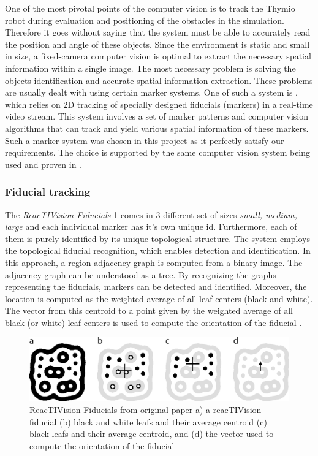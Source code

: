 One of the most pivotal points of the computer vision is to track the Thymio robot during evaluation and positioning of the obstacles in the simulation. Therefore it goes without saying that the system must be able to accurately read the position and angle of these objects. Since the environment is static and small in size, a fixed-camera computer vision is optimal to extract the necessary spatial information within a single image. The most necessary problem is solving the objects identification and accurate spatial information extraction. These problems are usually dealt with using certain marker systems. One of such a system is \citep{bencina2005improved}, which relies on 2D tracking of specially designed fiducials (markers) in a real-time video stream. This system involves a set of marker patterns and computer vision algorithms that can track and yield various spatial information of these markers. Such a marker system was chosen in this project as it perfectly satisfy our requirements. The choice is supported by the same computer vision system being used and proven in \citep{faina2017automating}.

\subsubsection{Fiducial tracking}

The \emph{ReacTIVision Fiducials} \ref{fig:fiducial_markers} comes in 3 different set of sizes \emph{small, medium, large} and each individual marker has it's own unique id. Furthermore, each of them is purely identified by its unique topological structure. The system employs the topological fiducial recognition, which enables detection and identification. In this approach, a region adjacency graph is computed from a binary image. The adjacency graph can be understood as a tree. By recognizing the graphs representing the fiducials, markers can be detected and identified. Moreover, the location is computed as the weighted average of all leaf centers (black and white). The vector from this centroid to a point given by the weighted average of all black (or white) leaf centers is used to compute the orientation of the fiducial \citep{bencina2005improved}.

\begin{figure}[H]
  \centering
  \includegraphics[width=0.66\linewidth]{include/images/fiducial_markers.PNG}
  \caption{ReacTIVision Fiducials from original paper a) a reacTIVision fiducial (b) black and white leafs and their average centroid (c) black leafs and their average centroid, and (d) the vector used to compute the orientation of the fiducial}
  \label{fig:fiducial_markers}
\end{figure}

